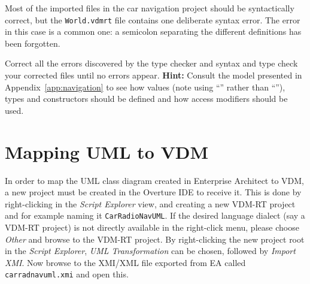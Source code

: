 Most of the imported files in the car navigation project should be
syntactically correct, but the \texttt{World.vdmrt} file contains one
deliberate syntax error. The error in this case is a common one: a
semicolon separating the different definitions has been forgotten.

\begin{myhardexercise}\label{ex:type-errors}
Correct all the errors discovered by the type checker and syntax and
type check your corrected files until no errors appear.
\textbf{Hint:} Consult the model presented in 
Appendix~\ref{app:navigation}
to see how values (note using ``\vdmstyle{=}'' rather than
``\vdmstyle{:=}''), types and constructors should be defined and how
access modifiers should be used.
\end{myhardexercise}


\section{Mapping UML to  VDM}\label{sec:fromUMLtoVDM}\label{sec:syntaxcheck}
\label{sec:typecheck}

In order to map the UML class diagram created in Enterprise Architect
to VDM, a new project must be created in the Overture IDE to receive
it. This is done by right-clicking in the \emph{Script Explorer} view,
and creating a new VDM-RT project and for example naming it
\texttt{CarRadioNavUML}. If the desired language dialect (say a VDM-RT 
project) is not directly available in the right-click menu, please choose
\emph{Other} and browse to the VDM-RT project. By right-clicking the new 
project root in the \emph{Script Explorer}, \emph{UML Transformation} can 
be chosen, followed by \emph{Import XMI}. Now browse to the XMI/XML file
exported from EA called \texttt{carradnavuml.xmi} and open this.



